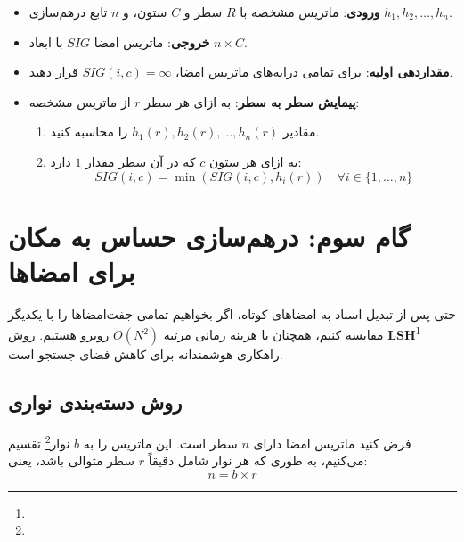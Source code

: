\begin{algorithmbox}
\begin{itemize}
    \item \textbf{ورودی}: ماتریس مشخصه با $R$ سطر و $C$ ستون، و $n$ تابع درهم‌سازی $h_1, h_2, \dots, h_n$.
    \item \textbf{خروجی}: ماتریس امضا $SIG$ با ابعاد $n \times C$.
    \item \textbf{مقداردهی اولیه}: برای تمامی درایه‌های ماتریس امضا، $SIG(i, c) = \infty$ قرار دهید.
    \item \textbf{پیمایش سطر به سطر}: به ازای هر سطر $r$ از ماتریس مشخصه:
    \begin{enumerate}
        \item مقادیر $h_1(r), h_2(r), \dots, h_n(r)$ را محاسبه کنید.
        \item به ازای هر ستون $c$ که در آن سطر مقدار $1$ دارد:
        \begin{equation}
        SIG(i, c) = \min(SIG(i, c), h_i(r)) \quad \forall i \in \{1, \dots, n\}
        \end{equation}
    \end{enumerate}
\end{itemize}
\end{algorithmbox}

\section{گام سوم: درهم‌سازی حساس به مکان \texorpdfstring{}{(LSH)} برای امضاها}
حتی پس از تبدیل اسناد به امضاهای کوتاه، اگر بخواهیم تمامی جفت‌امضاها را با یکدیگر مقایسه کنیم، همچنان با هزینه زمانی مرتبه $O(N^2)$ روبرو هستیم. روش \textbf{LSH}\footnote{} راهکاری هوشمندانه برای کاهش فضای جستجو است.

\subsection{روش دسته‌بندی نواری \texorpdfstring{}{(Banding Technique)}}
فرض کنید ماتریس امضا دارای $n$ سطر است. این ماتریس را به $b$ نوار\footnote{} تقسیم می‌کنیم، به طوری که هر نوار شامل دقیقاً $r$ سطر متوالی باشد، یعنی:
\begin{equation}
n = b \times r
\end{equation}

